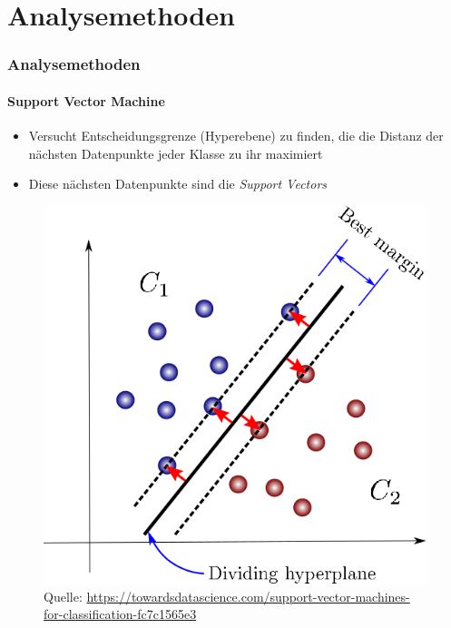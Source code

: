 \documentclass{beamer}
\newcommand*{\quelle}{%
	\footnotesize Quelle:
}
\begin{document}
\section{Analysemethoden}
\begin{frame}
\frametitle{Analysemethoden}
\framesubtitle{Support Vector Machine}
\begin{itemize}\setlength\parskip{12pt}
\item Versucht Entscheidungsgrenze (Hyperebene) zu finden, die die Distanz der nächsten Datenpunkte jeder Klasse zu ihr maximiert
\item Diese nächsten Datenpunkte sind die \textit{Support Vectors}
\end{itemize}
\begin{figure}
	\centering
	\includegraphics[scale=0.25]{svm.png}\\
	\quelle\url{https://towardsdatascience.com/support-vector-machines-for-classification-fc7c1565e3}
\end{figure}
\end{frame}
\end{document}
